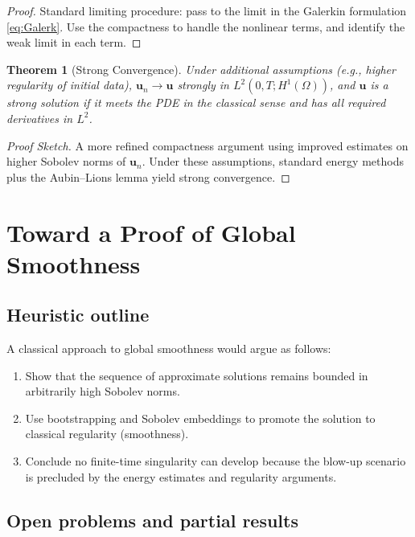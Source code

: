 \documentclass[11pt]{article}
\newtheorem{theorem}{Theorem}[section]
\numberwithin{equation}{section}
\begin{document}
\begin{proof}
Standard limiting procedure: pass to the limit in the Galerkin formulation
\eqref{eq:Galerk}. Use the compactness to handle the nonlinear terms,
and identify the weak limit in each term.
\end{proof}

\begin{theorem}[Strong Convergence]
Under additional assumptions (e.g., higher regularity of initial data),
\(\mathbf{u}_n \to \mathbf{u}\) strongly in \(L^2(0,T;H^1(\Omega))\),
and \(\mathbf{u}\) is a \emph{strong solution} if it meets the PDE in the classical sense
and has all required derivatives in \(L^2\).
\end{theorem}

\begin{proof}[Proof Sketch]
A more refined compactness argument using improved estimates on higher Sobolev
norms of \(\mathbf{u}_n\). Under these assumptions, standard energy methods
plus the Aubin--Lions lemma yield strong convergence.
\end{proof}

\section{Toward a Proof of Global Smoothness}\label{sec:global_smoothness}

\subsection{Heuristic outline}

A classical approach to global smoothness would argue as follows:
\begin{enumerate}[label=(\arabic*)]
\item Show that the sequence of approximate solutions remains bounded
      in arbitrarily high Sobolev norms.
\item Use bootstrapping and Sobolev embeddings to promote the solution
      to classical regularity (smoothness).
\item Conclude no finite-time singularity can develop because the
      blow-up scenario is precluded by the energy estimates and regularity
      arguments.
\end{enumerate}

\subsection{Open problems and partial results}
\end{document}
